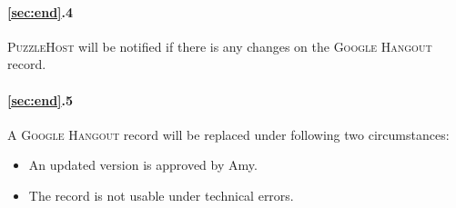 \documentclass{article}
\newcommand{\hangout}{\textsc{Google Hangout}\xspace}
\newcommand{\host}{\textsc{PuzzleHost}\xspace}
\begin{document}
\paragraph{\ref{sec:end}.4} \host will be notified if there is any changes on the \hangout record.

\paragraph{\ref{sec:end}.5} A \hangout record will be replaced under following two circumstances:
\begin{itemize}
	\item An updated version is approved by Amy.
	\item The record is not usable under technical errors.
\end{itemize}
\end{document}
